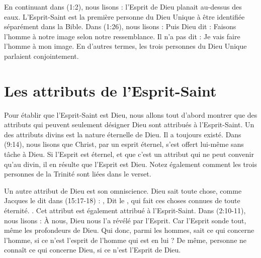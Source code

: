 En continuant dans (1:2), nous lisons : \og l'Esprit de Dieu planait au-dessus des eaux. \fg{} L'Esprit-Saint est la première personne du Dieu Unique à être identifiée séparément dans la Bible. Dans (1:26), nous lisons : \og Puis Dieu dit : Faisons l'homme à notre image selon notre ressemblance. \fg{} Il n'a pas dit : \og Je vais faire l'homme à mon image. \fg{} En d'autres termes, les trois personnes du Dieu Unique parlaient conjointement.

\section{Les attributs de l'Esprit-Saint}

Pour établir que l'Esprit-Saint est Dieu, nous allons tout d'abord montrer que des attributs qui peuvent seulement désigner Dieu sont attribués à l'Esprit-Saint. Un des attributs divins est la nature éternelle de Dieu. Il a toujours existé. Dans (9:14), nous lisons que Christ, par un esprit éternel, s'est offert lui-même sans tâche à Dieu. Si l'Esprit est éternel, et que c'est un attribut qui ne peut convenir qu'au divin, il en résulte que l'Esprit est Dieu. Notez également comment les trois personnes de la Trinité sont liées dans le verset.

Un autre attribut de Dieu est son omniscience. Dieu sait toute chose, comme Jacques le dit dans (15:17-18) : \og [...], Dit le \Seigneur{}, qui fait ces choses connues de toute éternité. \fg{} . Cet attribut est également attribué à l'Esprit-Saint. Dans (2:10-11), nous lisons : \og À nous, Dieu nous l'a révélé par l'Esprit. Car l'Esprit sonde tout, même les profondeurs de Dieu. Qui donc, parmi les hommes, sait ce qui concerne l'homme, si ce n'est l'esprit de l'homme qui est en lui ? De même, personne ne connaît ce qui concerne Dieu, si ce n'est l'Esprit de Dieu. \fg{}


